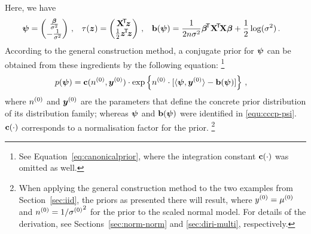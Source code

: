 Here, we have
\begin{align}
\boldsymbol{\psi}          &= \begin{pmatrix} \frac{\boldsymbol{\beta}}{\sigma^2} \\ -\frac{1}{\sigma^2} \end{pmatrix}\,, &
\tau({\bm z})       &= \begin{pmatrix} \mathbf{X}^{{\mbox{\!\scriptsize\textsf{T}}}} \! {\bm z} \\ \frac{1}{2} {\bm z}^{{\mbox{\!\scriptsize\textsf{T}}}} \! {\bm z} \end{pmatrix}\,, &
\mathbf{b}(\boldsymbol{\psi}) &= \frac{1}{2n\sigma^2} \boldsymbol{\beta}^{{\mbox{\!\scriptsize\textsf{T}}}} \mathbf{X}^{{\mbox{\!\scriptsize\textsf{T}}}} \! \mathbf{X} \boldsymbol{\beta} + \frac{1}{2}\log(\sigma^2)\,.
\label{equ:cccp-psi}
\end{align}
According to the general construction method, a conjugate prior %
for $\boldsymbol{\psi}$ can be obtained from these ingredients by the following equation:%
\footnote{See Equation~\ref{eq:canonicalprior}, where the integration constant $\mathbf{c}(\cdot)$ was omitted as well.}
\begin{align}
p(\boldsymbol{\psi}) &= \mathbf{c}(n^{(0)},{\bm y}^{(0)})\cdot \exp\left\{ n^{(0)} \cdot [\langle \boldsymbol{\psi}, {\bm y}^{(0)} \rangle - \mathbf{b}(\boldsymbol{\psi})] \right\}\,,
\label{eq:canonicalconjugate-festschrift}
\end{align}
where $n^{(0)}$ and ${\bm y}^{(0)}$ are the parameters that define the concrete prior distribution of its distribution family;
whereas $\boldsymbol{\psi}$ and $\mathbf{b}(\boldsymbol{\psi})$ were identified in \eqref{equ:cccp-psi}.
$\mathbf{c}(\cdot)$ corresponds to a normalisation factor for the prior.%
\footnote{When applying the general construction method to the two examples from Section~\ref{sec:iid},
the priors as presented there will result,
where $y^{(0)} = \mu^{(0)}$ and $n^{(0)} = 1/{\sigma^{(0)}}^2$ for the prior to the scaled normal model.
For details of the derivation, see Sections~\ref{sec:norm-norm} and \ref{sec:diri-multi}, respectively.}

